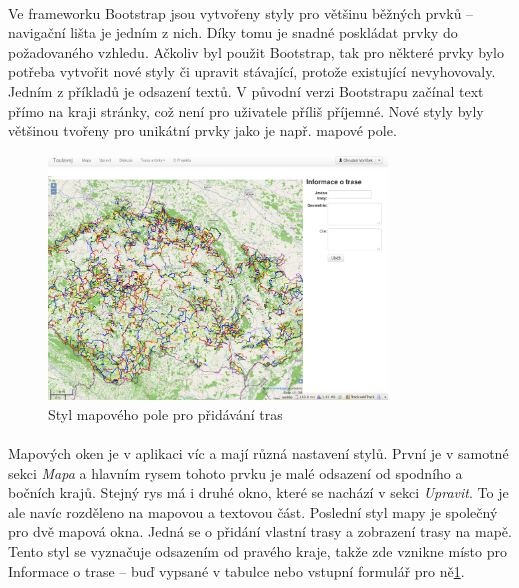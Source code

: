 \documentclass[11pt,a4paper,titlepage,oneside]{book}
\begin{document}
			\paragraph{} Ve frameworku Bootstrap jsou vytvořeny styly pro většinu běžných prvků -- navigační lišta je jedním z nich. Díky tomu je snadné poskládat prvky do požadovaného vzhledu. Ačkoliv byl použit Bootstrap, tak pro některé prvky bylo potřeba vytvořit nové styly či upravit stávající, protože existující nevyhovovaly. Jedním z příkladů je odsazení textů. V původní verzi Bootstrapu začínal text přímo na kraji stránky, což není pro uživatele příliš příjemné. Nové styly byly většinou tvořeny pro unikátní prvky jako je např. mapové pole.
		\begin{figure}[!h]
			\begin{center}
				\includegraphics[width=9cm]{obrazky/toulavej/addTrack.png}
				\caption{Styl mapového pole pro přidávání tras}
				\label{fig:addTrack}
			\end{center}
		\end{figure}	
			\paragraph{} Mapových oken je v aplikaci víc a mají různá nastavení stylů. První je v samotné sekci \textit{Mapa} a hlavním rysem tohoto prvku je malé odsazení od spodního a bočních krajů. Stejný rys má i druhé okno, které se nachází v sekci \textit{Upravit}. To je ale navíc rozděleno na mapovou a textovou část. Poslední styl mapy je společný pro dvě mapová okna. Jedná se o přidání vlastní trasy a zobrazení trasy na mapě. Tento styl se vyznačuje odsazením od pravého kraje, takže zde vznikne místo pro Informace o trase -- buď vypsané v tabulce nebo vstupní formulář pro ně\ref{fig:addTrack}.
\end{document}
